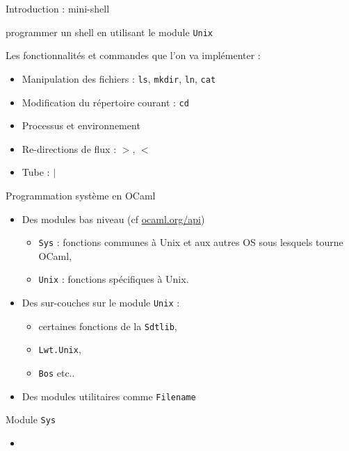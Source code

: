 
\begin{frame}{Introduction : mini-shell}

     programmer un shell en utilisant le module \texttt{Unix} 
    
    
    Les fonctionnalités et commandes que l'on va implémenter :
    \begin{itemize}[label=\small{}]
        \item<1-> Manipulation des fichiers : \texttt{ls}, \texttt{mkdir}, \texttt{ln}, \texttt{cat}
        \item<1-> Modification du répertoire courant : \texttt{cd}
        \item<1-> Processus et environnement %
        \item<1-> Re-directions de flux :  $>$, $<$
        \item<1-> Tube : $|$

    \end{itemize}
\end{frame}

\begin{frame}{Programmation système en OCaml}

    \begin{itemize}[label=\small{}]
        \item Des modules bas niveau (cf \url{ocaml.org/api})
            \begin{itemize}[label=\small{}]
                \item \texttt{Sys} : fonctions communes à Unix et aux autres OS sous lesquels tourne OCaml,
                \item \texttt{Unix} : fonctions spécifiques à Unix.
            \end{itemize}
        \item Des sur-couches sur le module \texttt{Unix} :
            \begin{itemize}[label=\small{}]
                \item certaines fonctions de la \texttt{Sdtlib}, 
                \item \texttt{Lwt.Unix}, 
                \item \texttt{Bos} etc..
            \end{itemize}
        \item Des modules utilitaires comme \texttt{Filename}
    \end{itemize}

\end{frame}

\begin{frame}{Module \texttt{Sys}}
    \begin{itemize}[label=\small{}]
        \item \wip
    \end{itemize}
\end{frame}